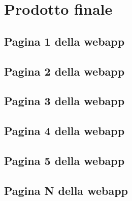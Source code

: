 \chapter{Prodotto finale}
\label{cap:prodotto-finale}


\setlength{\parskip}{3ex}

\section{Pagina 1 della webapp}


\section{Pagina 2 della webapp}


\section{Pagina 3 della webapp}


\section{Pagina 4 della webapp}


\section{Pagina 5 della webapp}

\section{Pagina N della webapp}
